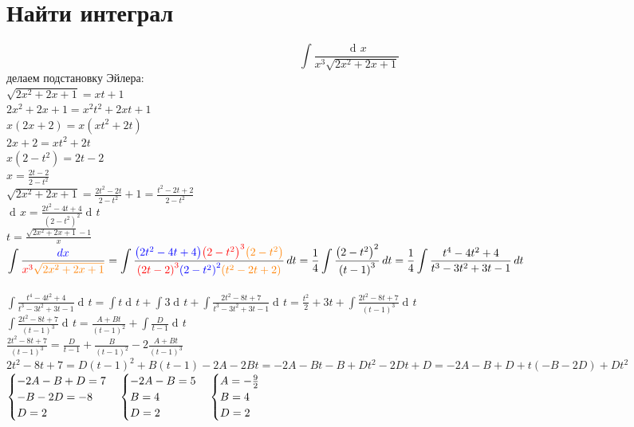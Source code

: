 \documentclass{article}
\newcommand{\red}[1]{{\color{red}{#1}}}
\newcommand{\orange}[1]{{\color{orange}{#1}}}
\newcommand{\blue}[1]{{\color{blue}{#1}}}
\newcommand{\ds}{\displaystyle}
\newcommand{\D}[1]{\mathop{d\!}{#1}}
\newcommand{\dx}{\D{x}}
\newcommand{\dt}{\D{t}}
\renewcommand{\L}{\left}
\newcommand{\R}{\right}
\newcommand{\F}{\frac}
\begin{document}
  \section{Найти интеграл}
  \[ \int \frac{\dx}{x^3\sqrt{2x^2+2x+1}} \]
  делаем подстановку Эйлера: \\
  $\ds \sqrt{2x^2+2x+1} = xt+1$ \\
  $\ds 2x^2+2x+1 = x^2t^2 + 2xt + 1$ \\
  $\ds x\L(2x + 2\R) = x\L(xt^2 + 2t\R)$ \\
  $\ds 2x + 2 = xt^2 + 2t$ \\
  $\ds x\L(2 - t^2\R) = 2t - 2$ \\
  $\ds x = \F{2t - 2}{2 - t^2}$ \\
  $\ds \sqrt{2x^2+2x+1} = \F{2t^2 - 2t}{2 - t^2} + 1 = \F{t^2 - 2t + 2}{2 - t^2}$ \\
  $\ds \dx = \F{2t^2 - 4t + 4}{\L(2 - t^2\R)^2} \dt$ \\
  $\ds t = \F{\sqrt{2x^2+2x+1}-1}{x} $ \\
  $\ds \int \F{\blue{\dx}}{\red{x^3}\orange{\sqrt{2x^2+2x+1}}}
  = \int \F{ \blue{\L(2t^2-4t+4\R)} \red{\L(2 - t^2\R)^3} \orange{\L(2 - t^2\R)} }{ \red{\L(2t - 2\R)^3} \blue{\L(2 - t^2\R)^2} \orange{\L(t^2 - 2t + 2\R)} } \dt
  = \F{1}{4} \int \F{ \L(2 - t^2\R)^2 }{ \L(t - 1\R)^3 } \dt
  = \F{1}{4} \int \F{ t^4 - 4t^2 + 4 }{ t^3 - 3t^2 + 3t - 1 } \dt
  $ \\
   \\
  $\ds \int \F{ t^4 - 4t^2 + 4 }{ t^3 - 3t^2 + 3t - 1 } \dt
  = \int t \dt + \int 3 \dt + \int \F{2t^2-8t+7}{t^3 - 3t^2 + 3t - 1} \dt
  = \F{t^2}{2} + 3t + \int \F{2t^2-8t+7}{\L(t - 1\R)^3} \dt$ \\
  $\ds \int \F{2t^2-8t+7}{\L(t - 1\R)^3} \dt = \F{A+Bt}{\L(t - 1\R)^2} + \int \F{D}{t - 1} \dt $ \\
  $\ds \F{2t^2-8t+7}{\L(t - 1\R)^3} = \F{D}{t - 1} + \F{B}{\L(t - 1\R)^2} - 2\F{A+Bt}{\L(t - 1\R)^3}$ \\
  $\ds 2t^2-8t+7 = D\L(t - 1\R)^2 + B\L(t - 1\R) - 2A - 2Bt = -2A - Bt - B + Dt^2 - 2Dt + D = -2A - B + D + t\L(-B-2D\R) + Dt^2$ \\
  $\begin{cases}
    -2A-B+D = 7 \\
    -B-2D = -8 \\
    D = 2 \\
  \end{cases} \hfill \begin{cases}
    -2A-B = 5 \\
    B = 4 \\
    D = 2 \\
  \end{cases} \hfill \begin{cases}
    A = -\F{9}{2} \\
    B = 4 \\
    D = 2 \\
  \end{cases}$ \\
\end{document}
